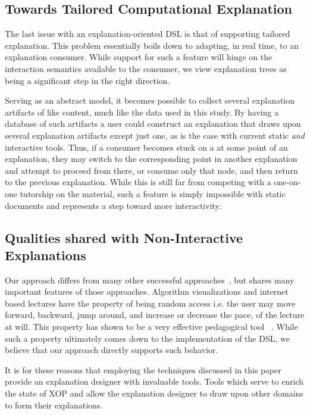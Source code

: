 \documentclass[sigconf]{acmart}
\begin{document}
\subsection{Towards Tailored Computational Explanation}
\label{sec:dis:tail}
The last issue with an explanation-oriented DSL is that of supporting tailored
explanation. This problem essentially boils down to adapting, in real time, to
an explanation consumer. While support for such a feature will hinge on the
interaction semantics available to the consumer, we view explanation trees as
being a significant step in the right direction.

Serving as an abstract model, it becomes possible to collect several explanation
artifacts of like content, much like the data used in this study. By having a
database of such artifacts a user could construct an explanation that draws upon
several explanation artifacts except just one, as is the case with current
static \emph{and} interactive tools. Thus, if a consumer becomes stuck on a
at some point of an explanation, they may switch to the corresponding point in
another explanation and attempt to proceed from there, or consume only that
node, and then return to the previous explanation. While this is still far from
competing with a one-on-one tutorship on the material, such a feature is simply
impossible with static documents and represents a step toward more interactivity.

\subsection{Qualities shared with Non-Interactive Explanations}
Our approach differs from many other successful
approaches~\cite{brecht2012learning, brecht2008enabling}, but shares many
important features of those approaches. Algorithm visualizations and internet
based lectures have the property of being random access i.e. the user may move
forward, backward, jump around, and increase or decrease the pace, of the
lecture at will. This property has shown to be a very effective pedagogical
tool~\cite{cardall2008live, zhang2005interactive, zhang2006instructional,
  Schwan2004293, Merkt2011687} . While such a property ultimately comes down to
the implementation of the DSL, we believe that our approach directly supports
such behavior.

It is for these reasons that employing the techniques discussed in this paper
provide an explanation designer with invaluable tools. Tools which serve to
enrich the state of XOP and allow the explanation designer to draw upon other
domains to form their explanations.
\end{document}
